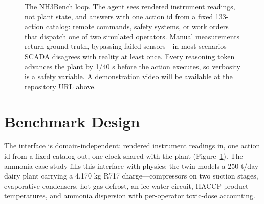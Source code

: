 \documentclass[letterpaper]{article} %
\begin{document}
\begin{figure}[t]
\centering
{}
\caption{The NH3Bench loop. The agent sees rendered instrument readings, not
plant state, and answers with one action id from a fixed 133-action catalog:
remote commands, safety systems, or work orders that dispatch one of two
simulated operators. Manual measurements return ground truth, bypassing
failed sensors---in most scenarios SCADA disagrees with reality at least
once. Every reasoning token advances the plant by 1/40 s before the action
executes, so verbosity is a safety variable. A demonstration video will be
available at the repository URL above.}
\label{fig:loop}
\end{figure}

\section{Benchmark Design}

The interface is domain-independent: rendered instrument readings in, one
action id from a fixed catalog out, one clock shared with the plant
(Figure~\ref{fig:loop}). The ammonia case
study fills this interface with physics: the twin models a 250 t/day dairy
plant carrying a 4{,}170 kg R717 charge---compressors on two suction
stages, evaporative condensers, hot-gas defrost, an ice-water circuit,
HACCP product temperatures, and ammonia dispersion with per-operator
toxic-dose accounting.
\end{document}
